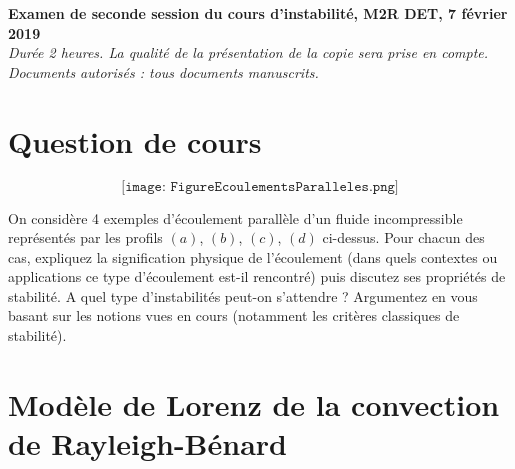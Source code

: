 \documentclass[a4paper,11pt]{article}
\begin{document}
{\Large
\noindent

\begin{center}
{\bf Examen de seconde session du cours d'instabilité, M2R DET, 7 février  2019} \\
{\it \small Durée 2 heures. La qualité de la présentation de la copie sera prise en compte. 
} \\
{\it \small Documents autorisés : tous documents manuscrits.}
\end{center}
}

%

\section{Question de cours}

$$
\texttt{[image: FigureEcoulementsParalleles.png]}
$$

On considère 4 exemples d'écoulement parallèle d'un fluide incompressible représentés par les profils $(a)$, $(b)$, $(c)$, $(d)$ ci-dessus.
Pour chacun des cas, expliquez la signification physique de l'écoulement (dans quels contextes ou applications ce type d'écoulement est-il rencontré)
puis discutez ses propriétés de stabilité. A quel type d'instabilités peut-on s'attendre ?  Argumentez en vous basant sur les notions vues en cours (notamment les critères classiques de stabilité).







\section{Modèle de Lorenz de la convection de Rayleigh-Bénard} \label{sec:lorenz}
\end{document}
